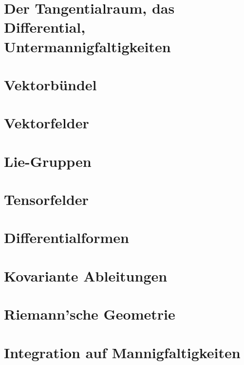 \documentclass[a4paper]{scrreprt}
\numberwithin{equation}{chapter}
\theoremstyle{plain}
\begin{document}
\chapter{Der Tangentialraum, das Differential, Untermannigfaltigkeiten}


\chapter{Vektorbündel}


\chapter{Vektorfelder}


\chapter{Lie-Gruppen}


\chapter{Tensorfelder}


\chapter{Differentialformen}


\chapter{Kovariante Ableitungen}


\chapter{Riemann'sche Geometrie}


\chapter{Integration auf Mannigfaltigkeiten}
\end{document}
